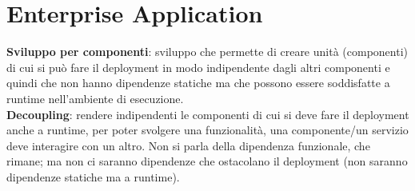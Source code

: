 \section{Enterprise Application}
\textbf{Sviluppo per componenti}: sviluppo che permette di creare unità (componenti) di cui si può fare il deployment in modo indipendente dagli altri componenti e quindi che non hanno dipendenze statiche ma che possono essere soddisfatte a runtime nell'ambiente di esecuzione.\\

\textbf{Decoupling}: rendere indipendenti le componenti di cui si deve fare il deployment anche a runtime, per poter svolgere una funzionalità, una componente/un servizio deve interagire con un altro. Non si parla della dipendenza funzionale, che rimane; ma non ci saranno dipendenze che ostacolano il deployment (non saranno dipendenze statiche ma a runtime).\\

